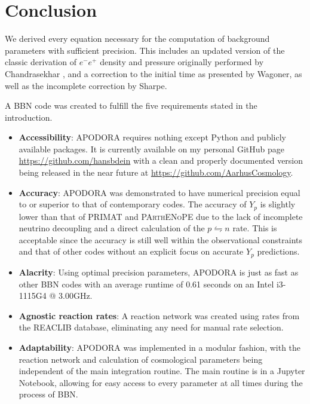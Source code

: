 








\chapter{Conclusion}
\label{chap:Conclusion}

We derived every equation necessary for the computation of background parameters with sufficient precision. This includes an updated version of the classic derivation of $e^{-}e^{+}$ density and pressure originally performed by Chandrasekhar \cite{Chandrasekhar}, and a correction to the initial time as presented by Wagoner\cite{Wagoner67}, as well as the incomplete correction by Sharpe\cite{sharpe2021big}. 

\noindent A BBN code was created to fulfill the five requirements stated in the introduction.
\begin{itemize}
    \item \textbf{Accessibility}: APODORA requires nothing except Python and publicly available packages. It is currently available on my personal GitHub page \url{https://github.com/hansbdein} with a clean and properly documented version being released in the near future at \url{https://github.com/AarhusCosmology}.
    \item \textbf{Accuracy}: APODORA was demonstrated to have numerical precision equal to or superior to that of contemporary codes. The accuracy of $Y_p$ is slightly lower than that of PRIMAT and \textsc{PArthENoPE} due to the lack of incomplete neutrino decoupling and a direct calculation of the $p\leftrightharpoons n$ rate. This is acceptable since the accuracy is still well within the observational constraints and that of other codes without an explicit focus on accurate $Y_p$ predictions.
    \item \textbf{Alacrity}: Using optimal precision parameters, APODORA is just as fast as other BBN codes with an average runtime of 0.61 seconds on an Intel i3-1115G4 @ 3.00GHz.
    \item \textbf{Agnostic reaction rates}: A reaction network was created using rates from the REACLIB database\cite{REACLIB}, eliminating any need for manual rate selection.
    \item \textbf{Adaptability}: APODORA was implemented in a modular fashion, with the reaction network and calculation of cosmological parameters being independent of the main integration routine. The main routine is in a Jupyter Notebook, allowing for easy access to every parameter at all times during the process of BBN. 
\end{itemize}




